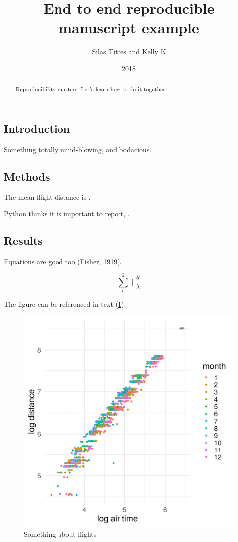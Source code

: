 \documentclass[12pt,a4paper,]{article}
\title{End to end reproducible manuscript example}
\author{Silas Tittes and Kelly K}
\date{2018}
\begin{document}
\maketitle
\begin{abstract}
Reproducibility matters. Let's learn how to do it together!
\end{abstract}

\subsection{Introduction}\label{introduction}

Something totally mind-blowing, and bodacious.

\subsection{Methods}\label{methods}

The mean flight distance is \meandistance{}.

\noindent
Python thinks it is important to report, \pyvar{}.

\subsection{Results}\label{results}

Equations are good too (Fisher, 1919).

\[\sum_{e}^{2} \mid \frac{\theta}{\lambda}\]

The figure can be referenced in-text (\ref{fig:flight}).

\begin{figure}
\centering
\includegraphics{figures/flight.png}
\caption{Something about flights\label{fig:flight}}
\end{figure}
\end{document}
